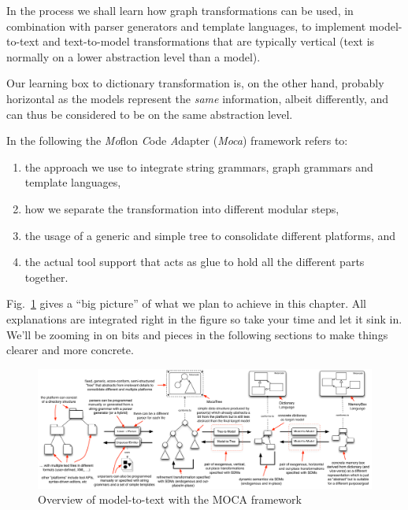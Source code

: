 In the process we shall learn how graph transformations can be used, in combination with parser generators and template languages, to implement model-to-text and text-to-model transformations that are typically vertical (text is normally on a lower abstraction level than a model).  

Our learning box to dictionary transformation is, on the other hand, probably horizontal as the models represent the \emph{same} information, albeit differently, and can thus be considered to be on the same abstraction level.

\vspace{1.5cm}


In the following the \emph{Mo}flon \emph{C}ode \emph{A}dapter (\emph{Moca}) framework refers to:
\begin{enumerate}
 \item the approach we use to integrate string grammars, graph grammars and template languages, 
 \item how we separate the transformation into different modular steps, 
 \item the usage of a generic and simple tree to consolidate different platforms, and 
 \item the actual tool support that acts as glue to hold all the different parts together.
\end{enumerate}
 
Fig.~\ref{fig:moca-overview} gives a ``big picture'' of what we plan to achieve in this chapter.
All explanations are integrated right in the figure so take your time and let it sink in.
We'll be zooming in on bits and pieces in the following sections to make things clearer and more concrete.
\begin{figure}[htp]
\begin{center}
 \includegraphics[angle=90, height=\textheight]{pics/moca/text-to-model}
  \caption{Overview of model-to-text with the MOCA framework}
  \label{fig:moca-overview}
\end{center}
\end{figure} 

\clearpage



 
 








%
 
